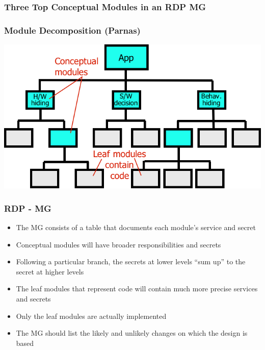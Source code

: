 \documentclass[t,12pt,numbers,fleqn]{beamer}
\begin{document}

\begin{frame}
\frametitle{Three Top Conceptual Modules in an RDP MG}


\end{frame}


\begin{frame}
\frametitle{Module Decomposition (Parnas)}

\begin{center}
\includegraphics[width=1.0\textwidth]{../Figures/ParnasDecompBySecrets.png}
\end{center}

\end{frame}


\begin{frame}
\frametitle{RDP - MG}

\begin{itemize}
\item The MG consists of a table that documents each module's service and secret
\item Conceptual modules will have broader responsibilities and secrets
\item Following a particular branch, the secrets at lower levels ``sum up'' to
  the secret at higher levels
\item The leaf modules that represent code will contain much more precise
  services and secrets
\item Only the leaf modules are actually implemented
\item The MG should list the likely and unlikely changes on which the design is based
\end{itemize}

\end{frame}
\end{document}
